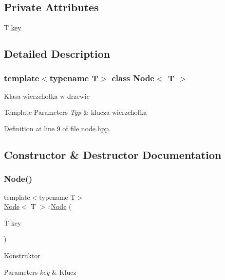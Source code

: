 \subsection*{Private Attributes}
\begin{DoxyCompactItemize}
\item 
T \hyperlink{classNode_a9d5e5c1914f5ed67389740354a607527}{key}
\end{DoxyCompactItemize}


\subsection{Detailed Description}
\subsubsection*{template$<$typename T$>$\newline
class Node$<$ T $>$}

Klasa wierzchołka w drzewie 
\begin{DoxyTemplParams}{Template Parameters}
{\em Typ} & klucza wierzchołka \\
\hline
\end{DoxyTemplParams}


Definition at line 9 of file node.\+hpp.



\subsection{Constructor \& Destructor Documentation}
\mbox{\label{classNode_a46dceddf91d9d3c68f941333ae1a7dc1}} 
\subsubsection{\texorpdfstring{Node()}{Node()}}
{\footnotesize\ttfamily template$<$typename T$>$ \\
\hyperlink{classNode}{Node}$<$ T $>$\+::\hyperlink{classNode}{Node} (\begin{DoxyParamCaption}\item[{T}]{key }\end{DoxyParamCaption})\hspace{0.3cm}{\ttfamily [inline]}}

Konstruktor 
\begin{DoxyParams}{Parameters}
{\em key} & Klucz \\
\hline
\end{DoxyParams}



